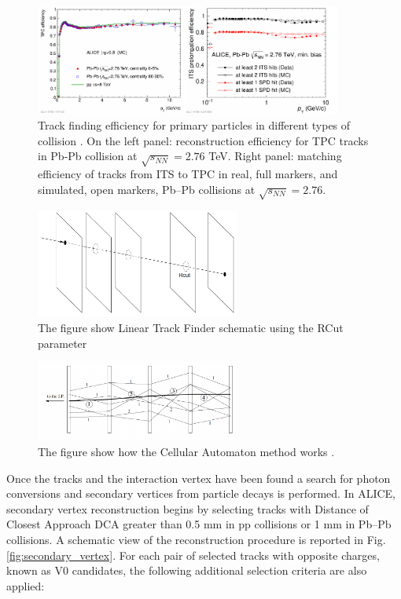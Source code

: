 \documentclass[12pt,a4paper]{book}
\begin{document}
 \begin{figure}[h]
 	\centering
 	\includegraphics[width=0.9\textwidth]{pictures/track_finding_efficiency.png}
 	\caption{Track finding efficiency for primary particles in different types of collision \cite{ALICE:2014sbxFs}. On the left panel: reconstruction efficiency for TPC tracks in Pb-Pb collision at $\sqrt{s_{NN}} = 2.76$ TeV. Right panel: matching efficiency of tracks from ITS to TPC in real, full markers, and simulated, open markers, Pb–Pb collisions at $\sqrt{s_{NN}} = 2.76$.}
 	\label{fig:track_finding_efficiency}
 \end{figure}
 
\begin{figure}
	\centering
		\includegraphics[width=0.6\textwidth]{pictures/linear_track.png}
		\caption{The figure show Linear Track Finder schematic using the RCut parameter \cite{CERN-LHCC-2015-001}}
		\label{fig:linear_track}
	\end{figure}
	\begin{figure}
		\centering
		\includegraphics[width=0.6\textwidth]{pictures/CA_track.png}
		\caption{The figure show how the Cellular Automaton method works \cite{CERN-LHCC-2015-001}.}
		\label{fig:CA_track}
\end{figure}


Once the tracks and the interaction vertex have been found a search for photon conversions and secondary vertices from particle decays is performed. In ALICE, secondary vertex reconstruction begins by selecting tracks with Distance of Closest Approach DCA greater than 0.5 mm in pp collisions or 1 mm in Pb–Pb collisions. A schematic view of the reconstruction procedure is reported in Fig. \ref{fig:secondary_vertex}. For each pair of selected tracks with opposite charges, known as V0 candidates, the following additional selection criteria are also applied:
\end{document}

